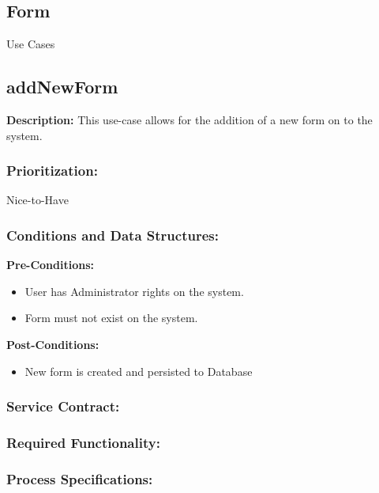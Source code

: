 
\newpage
\setlength{\voffset}{-3cm}

\begin{center}
\section{\textbf{\huge{Form}}}

\Large{Use Cases}
\end{center}


\subsection{addNewForm}
\textbf{Description:}
This use-case allows for the addition of a new form on to the system.
\subsubsection{Prioritization:}
Nice-to-Have
\subsubsection{Conditions and Data Structures:}
\textbf{Pre-Conditions:}
\begin{itemize}
	\item User has Administrator rights on the system.
	\item Form must not exist on the system.
\end{itemize}

\textbf{Post-Conditions:}	
\begin{itemize}
	\item New form is created and persisted to Database
\end{itemize}
\subsubsection{Service Contract:} 
\subsubsection{Required Functionality:}
\subsubsection{Process Specifications:} 

